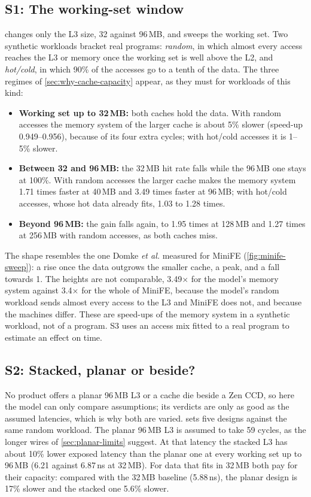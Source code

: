 \subsection{S1: The working-set window}
\label{sec:sim-window}
 changes only the L3 size, 32 against 96\,MB, and sweeps the working set. Two synthetic workloads bracket real programs: \emph{random}, in which almost every access reaches the L3 or memory once the working set is well above the L2, and \emph{hot/cold}, in which 90\% of the accesses go to a tenth of the data. The three regimes of \cref{sec:why-cache-capacity} appear, as they must for workloads of this kind:
\begin{itemize}
  \item \textbf{Working set up to 32\,MB:} both caches hold the data. With random accesses the memory system of the larger cache is about 5\% slower (speed-up 0.949--0.956), because of its four extra cycles; with hot/cold accesses it is 1--5\% slower.
  \item \textbf{Between 32 and 96\,MB:} the 32\,MB hit rate falls while the 96\,MB one stays at 100\%. With random accesses the larger cache makes the memory system 1.71 times faster at 40\,MB and 3.49 times faster at 96\,MB; with hot/cold accesses, whose hot data already fits, 1.03 to 1.28 times.
  \item \textbf{Beyond 96\,MB:} the gain falls again, to 1.95 times at 128\,MB and 1.27 times at 256\,MB with random accesses, as both caches miss.
\end{itemize}
The shape resembles the one Domke \emph{et al.} measured for MiniFE (\cref{fig:minife-sweep}): a rise once the data outgrows the smaller cache, a peak, and a fall towards 1. The heights are not comparable, 3.49$\times$ for the model's memory system against 3.4$\times$ for the whole of MiniFE, because the model's random workload sends almost every access to the L3 and MiniFE does not, and because the machines differ. These are speed-ups of the memory system in a synthetic workload, not of a program. S3 uses an access mix fitted to a real program to estimate an effect on time.



\subsection{S2: Stacked, planar or beside?}
\label{sec:sim-designs}
No product offers a planar 96\,MB L3 or a cache die beside a Zen CCD, so here the model can only compare assumptions; its verdicts are only as good as the assumed latencies, which is why both are varied.  sets five designs against the same random workload. The planar 96\,MB L3 is assumed to take 59 cycles, as the longer wires of \cref{sec:planar-limits} suggest. At that latency the stacked L3 has about 10\% lower exposed latency than the planar one at every working set up to 96\,MB (6.21 against 6.87\,ns at 32\,MB). For data that fits in 32\,MB both pay for their capacity: compared with the 32\,MB baseline (5.88\,ns), the planar design is 17\% slower and the stacked one 5.6\% slower.

